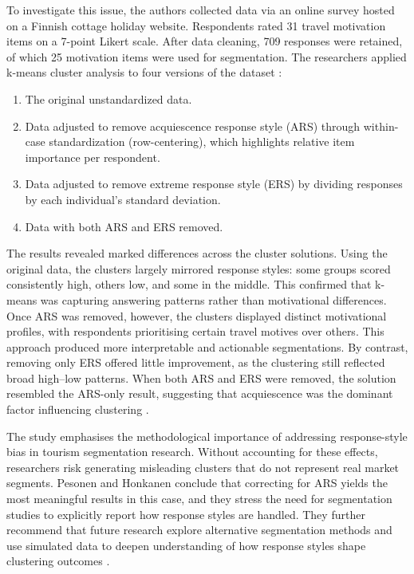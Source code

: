 \documentclass[a4paper, 12pt, twoside]{report}  %
\begin{document}
\indent To investigate this issue, the authors collected data via an online survey hosted on a Finnish cottage holiday website. Respondents rated 31 travel motivation items on a 7-point Likert scale. After data cleaning, 709 responses were retained, of which 25 motivation items were used for segmentation. The researchers applied k-means cluster analysis to four versions of the dataset \cite{clustering}:

\begin{enumerate}
    \item The original unstandardized data.
    \item Data adjusted to remove acquiescence response style (ARS) through within-case standardization (row-centering), which highlights relative item importance per respondent.
    \item Data adjusted to remove extreme response style (ERS) by dividing responses by each individual’s standard deviation.
    \item Data with both ARS and ERS removed.
\end{enumerate}

\indent The results revealed marked differences across the cluster solutions. Using the original data, the clusters largely mirrored response styles: some groups scored consistently high, others low, and some in the middle. This confirmed that k-means was capturing answering patterns rather than motivational differences. Once ARS was removed, however, the clusters displayed distinct motivational profiles, with respondents prioritising certain travel motives over others. This approach produced more interpretable and actionable segmentations. By contrast, removing only ERS offered little improvement, as the clustering still reflected broad high–low patterns. When both ARS and ERS were removed, the solution resembled the ARS-only result, suggesting that acquiescence was the dominant factor influencing clustering \cite{clustering}.

\indent The study emphasises the methodological importance of addressing response-style bias in tourism segmentation research. Without accounting for these effects, researchers risk generating misleading clusters that do not represent real market segments. Pesonen and Honkanen conclude that correcting for ARS yields the most meaningful results in this case, and they stress the need for segmentation studies to explicitly report how response styles are handled. They further recommend that future research explore alternative segmentation methods and use simulated data to deepen understanding of how response styles shape clustering outcomes \cite{clustering}.
\end{document}
